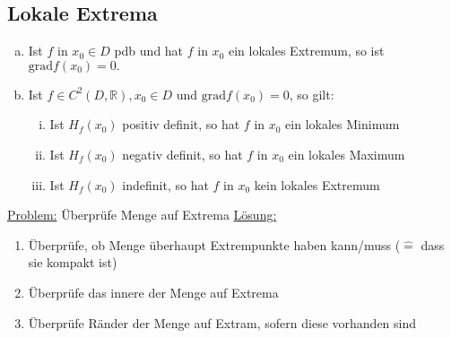 \documentclass{article}
\begin{document}
\subsection{Lokale Extrema}
\begin{enumerate} [a)]
    \item Ist $f$ in $x_0 \in D$ pdb und hat $f$ in $x_0$ ein lokales Extremum, so ist $\text{grad}f(x_0) = 0.$
    \item Ist $f \in C^2(D,\mathbb{R}), x_0 \in D$ und $\text{grad}f(x_0) = 0$, so gilt:
    \begin{enumerate} [i)]
        \item Ist $H_f(x_0)$ positiv definit, so hat $f$ in $x_0$ ein lokales Minimum
        \item Ist $H_f(x_0)$ negativ definit, so hat $f$ in $x_0$ ein lokales Maximum
        \item Ist $H_f(x_0)$ indefinit, so hat $f$ in $x_0$ kein lokales Extremum
    \end{enumerate}
\end{enumerate}
\underline{Problem:} Überprüfe Menge auf Extrema
\underline{Lösung:} 
\begin{enumerate}
    \item Überprüfe, ob Menge überhaupt Extrempunkte haben kann/muss ($\widehat{=}$ dass sie kompakt ist)
    \item Überprüfe das innere der Menge auf Extrema
    \item Überprüfe Ränder der Menge auf Extram, sofern diese vorhanden sind
\end{enumerate}
\end{document}

